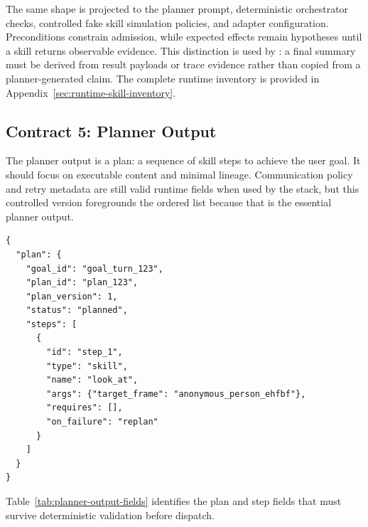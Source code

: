 The same shape is projected to the planner prompt, deterministic orchestrator checks, controlled fake skill simulation policies, and adapter configuration. Preconditions constrain admission, while expected effects remain hypotheses until a skill returns observable evidence. This distinction is used by : a final summary must be derived from result payloads or trace evidence rather than copied from a planner-generated claim. The complete runtime inventory is provided in Appendix~\ref{sec:runtime-skill-inventory}.

\subsection{Contract 5: Planner Output}

The planner output is a plan: a sequence of skill steps to achieve the user goal. It should focus on executable content and minimal lineage. Communication policy and retry metadata are still valid runtime fields when used by the stack, but this controlled version foregrounds the ordered  list because that is the essential planner output.

\begin{lstlisting}
{
  "plan": {
    "goal_id": "goal_turn_123",
    "plan_id": "plan_123",
    "plan_version": 1,
    "status": "planned",
    "steps": [
      {
        "id": "step_1",
        "type": "skill",
        "name": "look_at",
        "args": {"target_frame": "anonymous_person_ehfbf"},
        "requires": [],
        "on_failure": "replan"
      }
    ]
  }
}
\end{lstlisting}

Table~\ref{tab:planner-output-fields} identifies the plan and step fields that must survive deterministic validation before dispatch.

